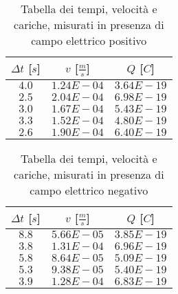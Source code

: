 \documentclass{article}
\begin{document}
\begin{multicols}{2}

\begin{table}[H]
	\centering
	\begin{tabular}{| c | c | c |}
		\hline
		$\Delta t$ [$s$] & $v$ [$\frac ms$] & $Q$ [$C$] \\
		\hline
		$4.0$ & $1.24E-04$ & $3.64E-19$ \\
		$2.5$ & $2.04E-04$ & $6.98E-19$ \\
		$3.0$ & $1.67E-04$ & $5.43E-19$ \\
		$3.3$ & $1.52E-04$ & $4.80E-19$ \\
		$2.6$ & $1.90E-04$ & $6.40E-19$ \\
		\hline
	\end{tabular}
	\caption{Tabella dei tempi, velocità e cariche, misurati in presenza di campo elettrico positivo}
	\label{}
\end{table}

\columnbreak

\begin{table}[H]
	\centering
	\begin{tabular}{| c | c | c |}
		\hline
		$\Delta t$ [$s$] & $v$ [$\frac ms$] & $Q$ [$C$] \\
		\hline
		$8.8$ & $5.66E-05$ & $3.85E-19$ \\
		$3.8$ & $1.31E-04$ & $6.96E-19$ \\
		$5.8$ & $8.64E-05$ & $5.09E-19$ \\
		$5.3$ & $9.38E-05$ & $5.40E-19$ \\
		$3.9$ & $1.28E-04$ & $6.83E-19$ \\
		\hline		
	\end{tabular}
	\caption{Tabella dei tempi, velocità e cariche, misurati in presenza di campo elettrico negativo}
	\label{}
\end{table}
	
\end{multicols}
\end{document}
